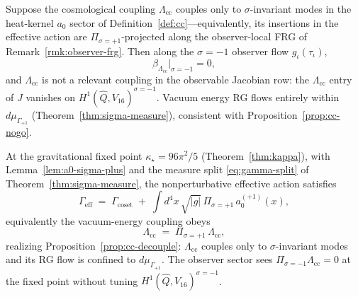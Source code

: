 \begin{proposition}[$\Lambda_{\mathrm{cc}}$ decoupling in the $\sigma=+1$ sector]
\label{prop:cc-decouple}
Suppose the cosmological coupling $\Lambda_{\mathrm{cc}}$ couples only to
$\sigma$-invariant modes in the heat-kernel $a_0$ sector of
Definition~\ref{def:cc}---equivalently, its insertions in the effective
action are $\Pi_{\sigma=+1}$-projected along the observer-local FRG of
Remark~\ref{rmk:observer-frg}. Then along the $\sigma=-1$ observer flow
$g_\iota(\tau_\iota)$,
\begin{equation}\label{eq:beta-Lambda-decouple}
  \beta_{\Lambda_{\mathrm{cc}}}\Big|_{\sigma=-1}=0,
\end{equation}
and $\Lambda_{\mathrm{cc}}$ is not a relevant coupling in the observable
Jacobian row: the $\Lambda_{\mathrm{cc}}$ entry of $J$ vanishes on
$H^1(\hat Q,V_{16})^{\sigma=-1}$. Vacuum energy RG flows entirely within
$d\mu_{\Gamma_{+1}}$ (Theorem~\ref{thm:sigma-measure}), consistent with
Proposition~\ref{prop:cc-nogo}.
\end{proposition}

\begin{theorem}
\label{thm:cc-sequester}
At the gravitational fixed point $\kappa_\star=96\pi^2/5$
(Theorem~\ref{thm:kappa}), with Lemma~\ref{lem:a0-sigma-plus} and the
measure split \eqref{eq:gamma-split} of Theorem~\ref{thm:sigma-measure},
the nonperturbative effective action satisfies
\begin{equation}\label{eq:gamma-cc-eff-derived}
  \Gamma_{\mathrm{eff}}
  \;=\;
  \Gamma_{\mathrm{coset}}
  \;+\;
  \int d^4x\,\sqrt{|g|}\,
  \Pi_{\sigma=+1}\,a_0^{(+1)}(x),
\end{equation}
equivalently the vacuum-energy coupling obeys
\begin{equation}\label{eq:a0-sequester}
  \Lambda_{\mathrm{cc}}
  \;=\;
  \Pi_{\sigma=+1}\,\Lambda_{\mathrm{cc}},
\end{equation}
realizing Proposition~\ref{prop:cc-decouple}:
$\Lambda_{\mathrm{cc}}$ couples only to $\sigma$-invariant modes and its RG
flow is confined to $d\mu_{\Gamma_{+1}}$. The observer sector sees
$\Pi_{\sigma=-1}\Lambda_{\mathrm{cc}}=0$ at the fixed point without tuning
$H^1(\hat Q,V_{16})^{\sigma=-1}$.
\end{theorem}

